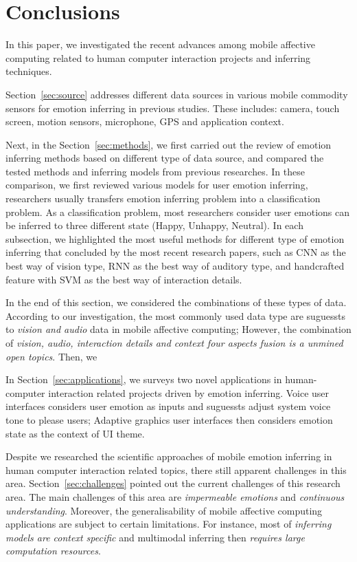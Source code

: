 \section{Conclusions}
\label{sec:conclusion}

In this paper, we investigated the recent advances among mobile affective computing related to human computer interaction projects and inferring techniques.

Section~\ref{sec:source} addresses different data sources in various mobile commodity sensors for emotion inferring in previous studies. These includes: camera, touch screen, motion sensors, microphone, GPS and application context. 

Next, in the Section~\ref{sec:methods},
we first carried out the review of emotion inferring methods based on different type of data source, and compared the tested methods and inferring models from previous researches. In these comparison, we first reviewed various models for user emotion inferring, researchers usually transfers emotion inferring problem into a classification problem. As a classification problem, most researchers consider user emotions can be inferred to three different state (Happy, Unhappy, Neutral). In each subsection, we highlighted the most useful methods for different type of emotion inferring that concluded by the most recent research papers, such as CNN as the best way of vision type, RNN as the best way of auditory type, and handcrafted feature with SVM as the best way of interaction details.

In the end of this section, we considered the combinations of these types of data. According to our investigation, the most commonly used data type are suguessts to \emph{vision and audio} data in mobile affective computing; However, the combination of \emph{vision, audio, interaction details and context four aspects fusion is a unmined open topics}.
Then, we 

In Section~\ref{sec:applications}, we surveys two novel applications in human-computer interaction related projects driven by emotion inferring. Voice user interfaces considers user emotion as inputs and suguessts adjust system voice tone to please users; Adaptive graphics user interfaces then considers emotion state as the context of UI theme.

Despite we researched the scientific approaches of mobile emotion inferring in human computer interaction related topics, there still apparent challenges in this area. Section~\ref{sec:challenges} pointed out the current challenges of this research area. The main challenges of this area are \emph{impermeable emotions} and \emph{continuous understanding}. Moreover, the generalisability of mobile affective computing applications are subject to certain limitations. For instance, most of \emph{inferring models are context specific} and multimodal inferring then \emph{requires large computation resources}.

